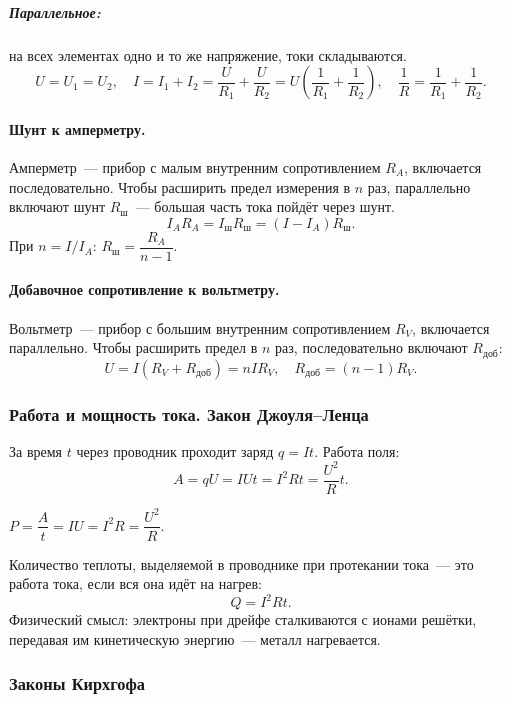 \documentclass[12pt]{article}
\begin{document}
\subparagraph{Параллельное:} на всех элементах одно и то же напряжение, токи складываются.
\[
	U = U_1 = U_2, \quad I = I_1 + I_2 = \frac{U}{R_1} + \frac{U}{R_2} = U\left(\frac{1}{R_1}+\frac{1}{R_2}\right), \quad \frac{1}{R} = \frac{1}{R_1} + \frac{1}{R_2}.
\]

\paragraph{Шунт к амперметру.}
Амперметр~--- прибор с малым внутренним сопротивлением $R_A$, включается последовательно. Чтобы расширить предел измерения в $n$ раз, параллельно включают шунт $R_{\text{ш}}$~--- большая часть тока пойдёт через шунт.
\[
	I_A R_A = I_{\text{ш}} R_{\text{ш}} = (I - I_A) R_{\text{ш}}.
\]
При $n = I/I_A$: $R_{\text{ш}} = \dfrac{R_A}{n-1}$.

\paragraph{Добавочное сопротивление к вольтметру.}
Вольтметр~--- прибор с большим внутренним сопротивлением $R_V$, включается параллельно. Чтобы расширить предел в $n$ раз, последовательно включают $R_{\text{доб}}$:
\[
	U = I(R_V + R_{\text{доб}}) = nIR_V, \quad R_{\text{доб}} = (n-1)R_V.
\]

\subsubsection{Работа и мощность тока. Закон Джоуля--Ленца}

\begin{definition}
	За время $t$ через проводник проходит заряд $q = It$. Работа поля:
	\[
		A = qU = IUt = I^2 Rt = \frac{U^2}{R}t.
	\]
\end{definition}

\begin{definition}
	$P = \dfrac{A}{t} = IU = I^2R = \dfrac{U^2}{R}$.
\end{definition}

\begin{law}
	Количество теплоты, выделяемой в проводнике при протекании тока~--- это работа тока, если вся она идёт на нагрев:
	\[
		Q = I^2 R t.
	\]
	Физический смысл: электроны при дрейфе сталкиваются с ионами решётки, передавая им кинетическую энергию~--- металл нагревается.
\end{law}

\subsubsection{Законы Кирхгофа}
\end{document}
